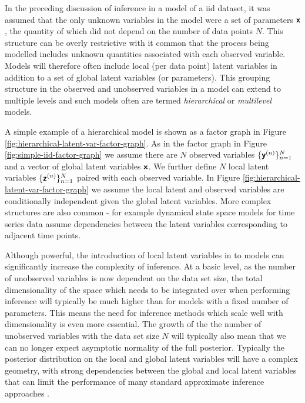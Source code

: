In the preceding discussion of inference in a model of a \ac{iid} dataset, it was assumed that the only unknown variables in the model were a set of parameters $\boldsymbol{\mathsf{x}}$, the quantity of which did not depend on the number of data points $N$. This structure can be overly restrictive with it common that the process being modelled includes unknown quantities associated with each observed variable. Models will therefore  often include local (per data point) latent variables in addition to a set of global latent variables (or parameters). This grouping structure in the observed and unobserved variables in a model can extend to multiple levels and such models often are termed \emph{hierarchical} or \emph{multilevel} models.

A simple example of a hierarchical model is shown as a factor graph in Figure \ref{fig:hierarchical-latent-var-factor-graph}. As in the factor graph in Figure \ref{fig:simple-iid-factor-graph} we assume there are $N$ observed variables $\lbrace \boldsymbol{\mathsf{y}}^{(n)} \rbrace_{n=1}^N$ and a vector of global latent variables $\boldsymbol{\mathsf{x}}$. We further define $N$ local latent variables $\lbrace \boldsymbol{\mathsf{z}}^{(n)} \rbrace_{n=1}^N$ paired with each observed variable. In Figure \ref{fig:hierarchical-latent-var-factor-graph} we assume the local latent and observed variables are conditionally independent given the global latent variables. More complex structures are also common - for example dynamical state space models for time series data assume dependencies between the latent variables corresponding to adjacent time points. %

Although powerful, the introduction of local latent variables in to models can significantly increase the complexity of inference. At a basic level, as the number of unobserved variables is now dependent on the data set size, the total dimensionality of the space which needs to be integrated over when performing inference will typically be much higher than for models with a fixed number of parameters. This means the need for inference methods which scale well with dimensionality is even more essential. The growth of the the number of unobserved variables with the data set size $N$ will typically also mean that we can no longer expect asymptotic normality of the full posterior. Typically the posterior distribution on the local and global latent variables will have a complex geometry, with strong dependencies between the global and local latent variables that can limit the performance of many standard approximate inference approaches \citep{betancourt2015hamiltonian}.

